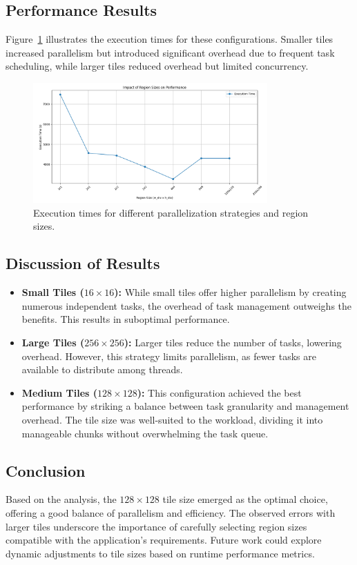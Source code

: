 \documentclass{article}
\begin{document}
\subsection*{Performance Results}
Figure~\ref{fig:performance_plot} illustrates the execution times for these configurations. Smaller tiles increased parallelism but introduced significant overhead due to frequent task scheduling, while larger tiles reduced overhead but limited concurrency.

\begin{figure}[h]
    \centering
    \includegraphics[width=0.8\textwidth]{./results/performance.png}
    \caption{Execution times for different parallelization strategies and region sizes.}
    \label{fig:performance_plot}
\end{figure}

\subsection*{Discussion of Results}
\begin{itemize}
    \item \textbf{Small Tiles (\(16 \times 16\)):}  
    While small tiles offer higher parallelism by creating numerous independent tasks, the overhead of task management outweighs the benefits. This results in suboptimal performance.
    \item \textbf{Large Tiles (\(256 \times 256\)):}  
    Larger tiles reduce the number of tasks, lowering overhead. However, this strategy limits parallelism, as fewer tasks are available to distribute among threads.
    \item \textbf{Medium Tiles (\(128 \times 128\)):}  
    This configuration achieved the best performance by striking a balance between task granularity and management overhead. The tile size was well-suited to the workload, dividing it into manageable chunks without overwhelming the task queue.
\end{itemize}

\subsection*{Conclusion}\vspace{-0.5em}
\noindent Based on the analysis, the \(128 \times 128\) tile size emerged as the optimal choice, offering a good balance of parallelism and efficiency. The observed errors with larger tiles underscore the importance of carefully selecting region sizes compatible with the application's requirements. Future work could explore dynamic adjustments to tile sizes based on runtime performance metrics.
\vspace{-0.5em}
\end{document}
